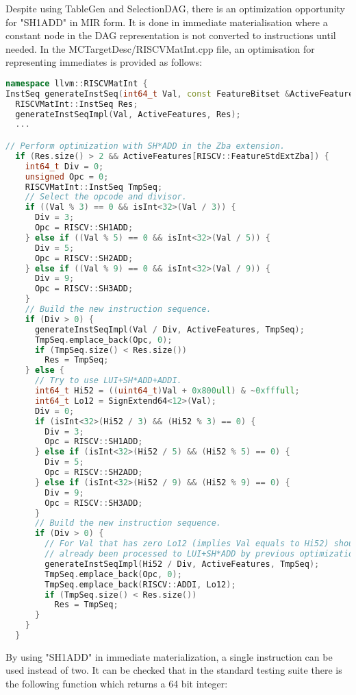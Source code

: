 Despite using TableGen and SelectionDAG, there is an optimization opportunity for "SH1ADD" in MIR form. It is done in immediate materialisation where a constant node in the DAG representation is not converted to instructions until needed. In the MCTargetDesc/RISCVMatInt.cpp file, an optimisation for representing immediates is provided as follows:

\begin{lstlisting}[language=C++, caption={Immediate Materialisation for "SH1ADD"}]
namespace llvm::RISCVMatInt {
InstSeq generateInstSeq(int64_t Val, const FeatureBitset &ActiveFeatures) {
  RISCVMatInt::InstSeq Res;
  generateInstSeqImpl(Val, ActiveFeatures, Res);
  ...

// Perform optimization with SH*ADD in the Zba extension.
  if (Res.size() > 2 && ActiveFeatures[RISCV::FeatureStdExtZba]) {
    int64_t Div = 0;
    unsigned Opc = 0;
    RISCVMatInt::InstSeq TmpSeq;
    // Select the opcode and divisor.
    if ((Val % 3) == 0 && isInt<32>(Val / 3)) {
      Div = 3;
      Opc = RISCV::SH1ADD;
    } else if ((Val % 5) == 0 && isInt<32>(Val / 5)) {
      Div = 5;
      Opc = RISCV::SH2ADD;
    } else if ((Val % 9) == 0 && isInt<32>(Val / 9)) {
      Div = 9;
      Opc = RISCV::SH3ADD;
    }
    // Build the new instruction sequence.
    if (Div > 0) {
      generateInstSeqImpl(Val / Div, ActiveFeatures, TmpSeq);
      TmpSeq.emplace_back(Opc, 0);
      if (TmpSeq.size() < Res.size())
        Res = TmpSeq;
    } else {
      // Try to use LUI+SH*ADD+ADDI.
      int64_t Hi52 = ((uint64_t)Val + 0x800ull) & ~0xfffull;
      int64_t Lo12 = SignExtend64<12>(Val);
      Div = 0;
      if (isInt<32>(Hi52 / 3) && (Hi52 % 3) == 0) {
        Div = 3;
        Opc = RISCV::SH1ADD;
      } else if (isInt<32>(Hi52 / 5) && (Hi52 % 5) == 0) {
        Div = 5;
        Opc = RISCV::SH2ADD;
      } else if (isInt<32>(Hi52 / 9) && (Hi52 % 9) == 0) {
        Div = 9;
        Opc = RISCV::SH3ADD;
      }
      // Build the new instruction sequence.
      if (Div > 0) {
        // For Val that has zero Lo12 (implies Val equals to Hi52) should has
        // already been processed to LUI+SH*ADD by previous optimization.
        generateInstSeqImpl(Hi52 / Div, ActiveFeatures, TmpSeq);
        TmpSeq.emplace_back(Opc, 0);
        TmpSeq.emplace_back(RISCV::ADDI, Lo12);
        if (TmpSeq.size() < Res.size())
          Res = TmpSeq;
      }
    }
  }

\end{lstlisting}

By using "SH1ADD" in immediate materialization, a single instruction can be used instead of two. It can be checked that in the standard testing suite there is the following function which returns a 64 bit integer:


